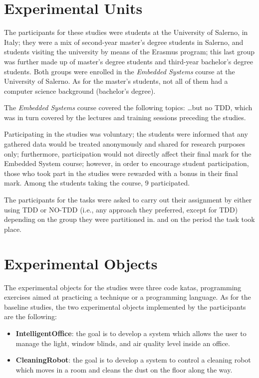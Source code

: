 \section{Experimental Units}
The participants for these studies were students at the University of Salerno, in Italy; they were a mix of second-year master's degree students in Salerno, and students visiting the university by means of the Erasmus program; this last group was further made up of master's degree students and third-year bachelor's degree students. Both groups were enrolled in the \textit{Embedded Systems} course at the University of Salerno. As for the master's students, not all of them had a computer science background (bachelor's degree).

The \textit{Embedded Systems} course covered the following topics: \dots but no TDD, which was in turn covered by the lectures and training sessions preceding the studies.

Participating in the studies was voluntary; the students were informed that any gathered data would be treated anonymously and shared for research purposes only; furthermore, participation would not directly affect their final mark for the Embedded System course; however, in order to encourage student participation, those who took part in the studies were rewarded with a bonus in their final mark. Among the students taking the course, 9 participated.

The participants for the tasks were asked to carry out their assignment by either using TDD or NO-TDD (i.e., any approach they preferred, except for TDD) depending on the group they were partitioned in. and on the period the task took place.



\section{Experimental Objects}
The experimental objects for the studies were three code katas, programming exercises aimed at practicing a technique or a programming language. As for the baseline studies, the two experimental objects implemented by the participants are the following:
\begin{itemize}
    \item \textbf{IntelligentOffice}: the goal is to develop a system which allows the user to manage the light, window blinds, and air quality level inside an office.
    \item \textbf{CleaningRobot}: the goal is to develop a system to control a cleaning robot which moves in a room and cleans the dust on the floor along the way. 
\end{itemize}


